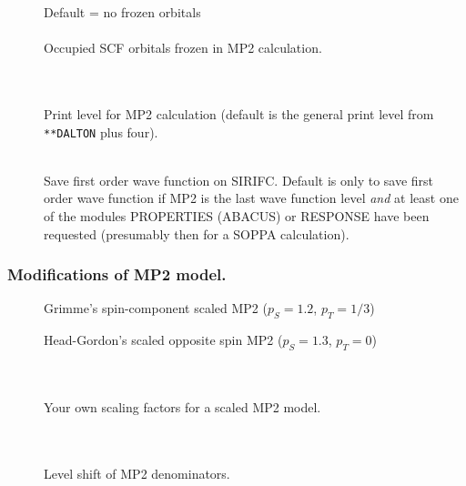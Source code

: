 \begin{description}

\item[]
  Default = no frozen orbitals\\
   \\
  Occupied SCF orbitals frozen in MP2 calculation.

\item[] \ \\
   \\
  Print level for MP2 calculation
  (default is the general print level from \verb|**DALTON| plus four).

\item[] \ \\
  Save first order wave function on SIRIFC.
  Default is only to save first order wave function if MP2 is the last wave function level
  \emph{and} at least one of the modules PROPERTIES (ABACUS) or RESPONSE have been
  requested (presumably then for a SOPPA calculation).

\end{description}

\subsubsection*{Modifications of MP2 model.}

\begin{description}

\item[]
  Grimme's spin-component scaled MP2 ($p_S = 1.2$, $p_T = 1/3$)

\item[]
  Head-Gordon's scaled opposite spin MP2 ($p_S = 1.3$, $p_T = 0$)

\item[] \ \\
   \\
  Your own scaling factors for a scaled MP2 model.

\item[] \ \\
   \\
  Level shift of MP2 denominators.
\end{description}



